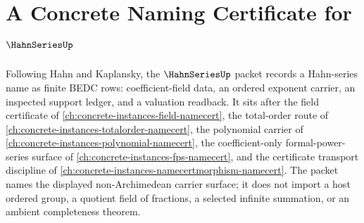\chapter{A Concrete Naming Certificate for $\HahnSeriesUp$}
\label{ch:concrete-instances-hahn-series-namecert}

Following Hahn and Kaplansky, the $\HahnSeriesUp$ packet records a Hahn-series name as finite BEDC rows: coefficient-field data, an ordered exponent carrier, an inspected support ledger, and a valuation readback. It sits after the field certificate of \autoref{ch:concrete-instances-field-namecert}, the total-order route of \autoref{ch:concrete-instances-totalorder-namecert}, the polynomial carrier of \autoref{ch:concrete-instances-polynomial-namecert}, the coefficient-only formal-power-series surface of \autoref{ch:concrete-instances-fps-namecert}, and the certificate transport discipline of \autoref{ch:concrete-instances-namecertmorphism-namecert}. The packet names the displayed non-Archimedean carrier surface; it does not import a host ordered group, a quotient field of fractions, a selected infinite summation, or an ambient completeness theorem.

